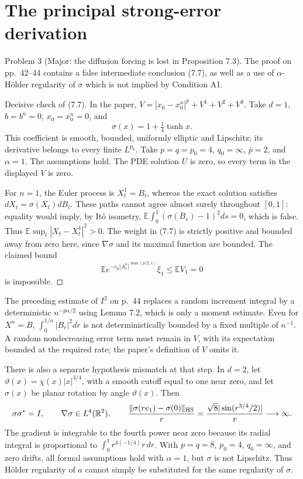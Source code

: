 \documentclass[10pt]{article}
\begin{document}
\section*{The principal strong-error derivation}
Problem 3 (Major: the diffusion forcing is lost in Proposition 7.3).  The proof on pp. 42–44 contains a false intermediate conclusion (7.7), as well as a use of \(\alpha\)-Hölder regularity of \(\sigma\) which is not implied by Condition A1.\par
Decisive check of (7.7). In the paper, \(V=|x_0-x_0^n|^{\bar p}+V^1+V^2+V^3\). Take \(d=1\), \(b=b^n=0\), \(x_0=x_0^n=0\), and \[\sigma(x)=1+\tfrac14\tanh x.\] This coefficient is smooth, bounded, uniformly elliptic and Lipschitz; its derivative belongs to every finite \(L^{p_0}\). Take \(p=q=p_0=4\), \(q_0=\infty\), \(\bar p=2\), and \(\alpha=1\). The assumptions hold. The PDE solution \(U\) is zero, so every term in the displayed \(V\) is zero.\par
For \(n=1\), the Euler process is \(X_t^1=B_t\), whereas the exact solution satisfies \(dX_t=\sigma(X_t)dB_t\). These paths cannot agree almost surely throughout \([0,1]\): equality would imply, by Itô isometry, \(\mathbb E\int_0^1(\sigma(B_s)-1)^2ds=0\), which is false. Thus \(\mathbb E\sup_t|X_t-X_t^1|^2>0\). The weight in (7.7) is strictly positive and bounded away from zero here, since \(\nabla\sigma\) and its maximal function are bounded. The claimed bound \[\mathbb Ee^{-c_{\bar p}|A_1^n|^{\max(\bar p/2,1)}}\xi_1\leq \mathbb EV_1=0\] is impossible. ◻\par
The preceding estimate of \(I^2\) on p. 44 replaces a random increment integral by a deterministic \(n^{-\bar p\alpha/2}\) using Lemma 7.2, which is only a moment estimate. Even for \(X^n=B\), \(\int_0^{1/n}|B_r|^2dr\) is not deterministically bounded by a fixed multiple of \(n^{-1}\). A random nondecreasing error term must remain in \(V\), with its expectation bounded at the required rate; the paper’s definition of \(V\) omits it.\par
There is also a separate hypothesis mismatch at that step. In \(d=2\), let \(\vartheta(x)=\chi(x)|x|^{3/4}\), with a smooth cutoff equal to one near zero, and let \(\sigma(x)\) be planar rotation by angle \(\vartheta(x)\). Then \[\sigma\sigma^*=I,\qquad \nabla\sigma\in L^4(\mathbb R^2),\qquad
\frac{\|\sigma(re_1)-\sigma(0)\|_{\rm HS}}r
=\frac{\sqrt8|\sin(r^{3/4}/2)|}r\longrightarrow\infty.\] The gradient is integrable to the fourth power near zero because its radial integral is proportional to \(\int_0^1 r^{4(-1/4)}r\,dr\). With \(p=q=8\), \(p_0=4\), \(q_0=\infty\), and zero drifts, all formal assumptions hold with \(\alpha=1\), but \(\sigma\) is not Lipschitz. Thus Hölder regularity of \(a\) cannot simply be substituted for the same regularity of \(\sigma\).\par
\end{document}
